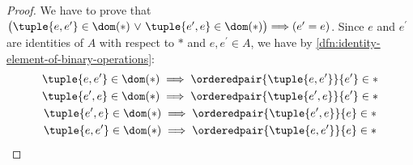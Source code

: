 \begin{proof}
    We have to prove that
    \( \big( \tuple{e,e^{\prime}} \in \dom (\ast) \,\,{\lor}\,\, \tuple{e^{\prime},e} \in \dom (\ast) \big) {\implies} \mleft( e^{\prime} = e \mright) \).
    Since \( e \) and \( e^{\prime} \) are identities of \( A \) with respect to \( \ast \) and \( e, e^{\prime} \in A \),
    we have by \cref{dfn:identity-element-of-binary-operations}:
    \begin{gather}
        \tuple{e,e^{\prime}} \in \dom (\ast)
        \implies
        \orderedpair{\tuple{e,e^{\prime}}}{e^{\prime}} \in \ast \label{eq:e-star-eprime-is-defined-implies-e-star-eprime-equals-eprime}\\
        \tuple{e^{\prime},e} \in \dom (\ast)
        \implies
        \orderedpair{\tuple{e^{\prime},e}}{e^{\prime}} \in \ast \label{eq:eprime-star-e-is-defined-implies-eprime-star-e-equals-eprime}\\
        \tuple{e^{\prime},e} \in \dom (\ast)
        \implies
        \orderedpair{\tuple{e^{\prime},e}}{e} \in \ast \label{eq:eprime-star-e-is-defined-implies-eprime-star-e-equals-e}\\
        \tuple{e,e^{\prime}} \in \dom (\ast)
        \implies
        \orderedpair{\tuple{e,e^{\prime}}}{e} \in \ast \label{eq:e-star-eprime-is-defined-implies-e-star-eprime-equals-e}
    \end{gather}


\end{proof}

